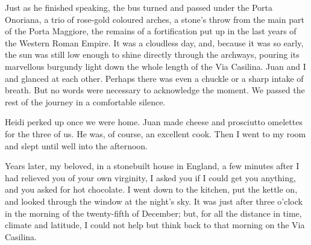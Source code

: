 Just as he finished speaking, the bus turned and passed under the Porta Onoriana, a trio of rose-gold coloured arches, a stone's throw from the main part of the Porta Maggiore, the remains of a fortification put up in the last years of the Western Roman Empire. It was a cloudless day, and, because it was so early, the sun was still low enough to shine directly through the archways, pouring its marvellous burgundy light down the whole length of the Via Casilina. Juan and I and glanced at each other. Perhaps there was even a chuckle or a sharp intake of breath. But no words were necessary to acknowledge the moment. We passed the rest of the journey in a comfortable silence.

Heidi perked up once we were home. Juan made cheese and prosciutto omelettes for the three of us. He was, of course, an excellent cook. Then I went to my room and slept until well into the afternoon.

\prosesep

Years later, my beloved, in a stonebuilt house in England, a few minutes after I had relieved you of your own virginity, I asked you if I could get you anything, and you asked for hot chocolate. I went down to the kitchen, put the kettle on, and looked through the window at the night's sky. It was just after three o'clock in the morning of the twenty-fifth of December; but, for all the distance in time, climate and latitude, I could not help but think back to that morning on the Via Casilina.
